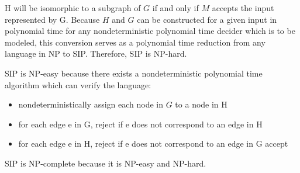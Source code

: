 \documentclass[12pt]{article}
\begin{document}
H will be isomorphic to a subgraph of $G$ if and only if $M$ accepts the input represented by G. Because $H$ and $G$ can be constructed for a given input in polynomial time for any nondeterministic polynomial time decider which is to be modeled, this conversion serves as a polynomial time reduction from any language in NP to SIP. Therefore, SIP is NP-hard.

\vspace{25px}

SIP is NP-easy because there exists a nondeterministic polynomial time algorithm which can verify the language:
\begin{itemize}
	\item nondeterministically assign each node in $G$ to a node in H
	\item for each edge e in G, reject if e does not correspond to an edge in H
	\item for each edge e in H, reject if e does not correspond to an edge in G
	accept
\end{itemize}

\vspace{25px}

SIP is NP-complete because it is NP-easy and NP-hard.
\end{document}
